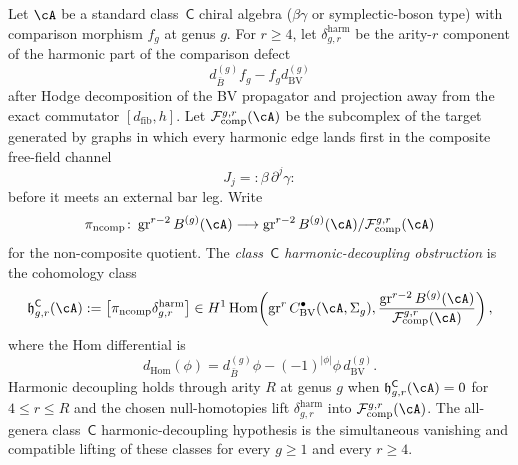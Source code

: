 \begin{definition}
\label{def:class-c-harmonic-decoupling-obstruction}
%
%
Let \(\cA\) be a standard class~\(\mathsf C\) chiral algebra
\textup{(}\(\beta\gamma\) or symplectic-boson type\textup{)} with
comparison morphism \(f_g\) at genus \(g\). For \(r\ge4\), let
\(\delta_{g,r}^{\mathrm{harm}}\) be the arity-\(r\) component of the
harmonic part of the comparison defect
\[
 d_{\bar B}^{(g)} f_g - f_g d_{\mathrm{BV}}^{(g)}
\]
after Hodge decomposition of the BV propagator and projection away from
the exact commutator \([d_{\mathrm{fib}},h]\). Let
\(\mathcal F_{\mathrm{comp}}^{g,r}(\cA)\) be the subcomplex of the
target generated by graphs in which every harmonic edge lands first in
the composite free-field channel
\[
 J_j=:\!\beta\,\partial^j\gamma\!:
\]
before it meets an external bar leg. Write
\[
 \pi_{\mathrm{ncomp}}\colon
 \operatorname{gr}^{r-2}B^{(g)}(\cA)
 \longrightarrow
 \operatorname{gr}^{r-2}B^{(g)}(\cA)/
 \mathcal F_{\mathrm{comp}}^{g,r}(\cA)
\]
for the non-composite quotient. The \emph{class~\(\mathsf C\)
harmonic-decoupling obstruction} is the cohomology class
\begin{equation}\label{eq:class-c-harmonic-decoupling-obstruction}
 \mathfrak h_{g,r}^{\mathsf C}(\cA)
 :=
 \bigl[\pi_{\mathrm{ncomp}}\delta_{g,r}^{\mathrm{harm}}\bigr]
 \in
 H^1\operatorname{Hom}\!\left(
 \operatorname{gr}^{r}C^\bullet_{\mathrm{BV}}(\cA,\Sigma_g),
 \frac{\operatorname{gr}^{r-2}B^{(g)}(\cA)}
      {\mathcal F_{\mathrm{comp}}^{g,r}(\cA)}
 \right),
\end{equation}
where the Hom differential is
\[
 d_{\operatorname{Hom}}(\phi)
 =
 d_{\bar B}^{(g)}\phi-(-1)^{|\phi|}\phi\,d_{\mathrm{BV}}^{(g)} .
\]
Harmonic decoupling holds through arity \(R\) at genus \(g\) when
\(\mathfrak h_{g,r}^{\mathsf C}(\cA)=0\) for \(4\le r\le R\) and the
chosen null-homotopies lift \(\delta_{g,r}^{\mathrm{harm}}\) into
\(\mathcal F_{\mathrm{comp}}^{g,r}(\cA)\). The all-genera
class~\(\mathsf C\) harmonic-decoupling hypothesis is the simultaneous
vanishing and compatible lifting of these classes for every \(g\ge1\)
and every \(r\ge4\).
\end{definition}


